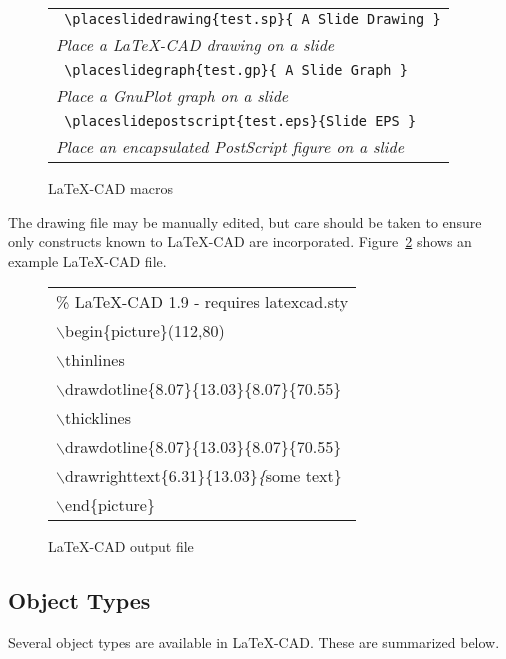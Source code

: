 \documentclass[a4paper]{article}
\newcommand{\bs}{$\backslash$}
\begin{document}
\begin{figure}
\begin{center}
\begin{tabular}{l}
            \verb! \placeslidedrawing{test.sp}{ A Slide Drawing }! \\
            \emph{Place a LaTeX-CAD drawing on a slide} \\
            \verb! \placeslidegraph{test.gp}{ A Slide Graph }! \\
            \emph{Place a GnuPlot graph on a slide} \\
            \verb! \placeslidepostscript{test.eps}{Slide EPS }! \\
            \emph{Place an encapsulated PostScript figure on a slide} \\
        \hline\hline
    \end{tabular}
    \end{center}
    \caption{LaTeX-CAD macros}
    \label{fig:lcadmacros}
\end{figure}

The drawing file may be manually edited, but care should be taken
to ensure only constructs known to LaTeX-CAD are incorporated.
Figure~\ref{fig:lcadfile} shows an example LaTeX-CAD file.


\begin{figure}
    \begin{center}
    \begin{tabular}{l}
        \hline
        \% LaTeX-CAD 1.9 - requires latexcad.sty \\
        \bs begin\{picture\}(112,80)             \\
        \bs thinlines                            \\
        \bs drawdotline\{8.07\}\{13.03\}\{8.07\}\{70.55\} \\
        \bs thicklines                          \\
        \bs drawdotline\{8.07\}\{13.03\}\{8.07\}\{70.55\} \\
        \bs drawrighttext\{6.31\}\{13.03\}\textit\{some text\} \\
        \bs end\{picture\}                      \\
        \hline\hline
    \end{tabular}
    \caption{LaTeX-CAD output file}
    \label{fig:lcadfile}
    \end{center}
\end{figure}

\subsection{ Object Types } \label{sec:objecttypes}
Several object types are available in LaTeX-CAD. These are
summarized below.
\end{document}
